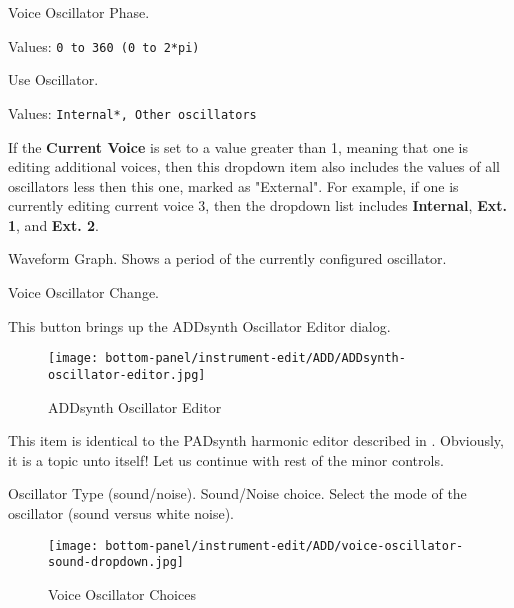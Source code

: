    \setcounter{ItemCounter}{0}      %

   Voice Oscillator Phase.

   Values: \texttt{0 to 360 (0 to 2*pi)}

   Use Oscillator.

   Values: \texttt{Internal*, Other oscillators}

   If the \textbf{Current Voice} is set to a value greater than 1, meaning
   that one is editing additional voices, then this dropdown item also
   includes the values of all oscillators less then this one, marked as
   "External".  For example, if one is currently editing current voice 3,
   then the dropdown list includes \textbf{Internal}, \textbf{Ext. 1}, and
   \textbf{Ext. 2}.

   Waveform Graph.
   Shows a period of the currently configured oscillator.

   Voice Oscillator Change.
   
   This button brings up the ADDsynth Oscillator Editor dialog.

\begin{figure}[H]
   \centering 
   \texttt{[image: bottom-panel/instrument-edit/ADD/ADDsynth-oscillator-editor.jpg]}
   \caption{ADDsynth Oscillator Editor}
   \label{fig:addsynth_oscillator_editor}
\end{figure}

   This item is identical to the PADsynth harmonic editor described in
   .
   Obviously, it is a topic unto itself!
   Let us continue with rest of the minor controls.

   Oscillator Type (sound/noise).
   Sound/Noise choice.
   Select the mode of the oscillator (sound versus white noise).

\begin{figure}[H]
   \centering 
   \texttt{[image: bottom-panel/instrument-edit/ADD/voice-oscillator-sound-dropdown.jpg]}
   \caption{Voice Oscillator Choices}
   \label{fig:voice_oscillator_choices}
\end{figure}

